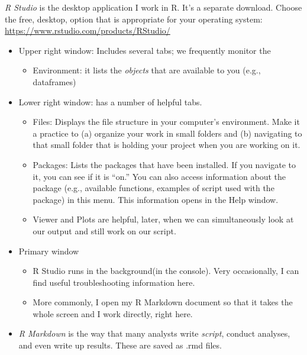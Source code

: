 \documentclass[
]{book}
\providecommand{\tightlist}{%
  \setlength{\itemsep}{0pt}\setlength{\parskip}{0pt}}
\begin{document}
\emph{R Studio} is the desktop application I work in R. It's a separate download. Choose the free, desktop, option that is appropriate for your operating system: \url{https://www.rstudio.com/products/RStudio/}

\begin{itemize}
\tightlist
\item
  Upper right window: Includes several tabs; we frequently monitor the

  \begin{itemize}
  \tightlist
  \item
    Environment: it lists the \emph{objects} that are available to you (e.g., dataframes)
  \end{itemize}
\item
  Lower right window: has a number of helpful tabs.

  \begin{itemize}
  \tightlist
  \item
    Files: Displays the file structure in your computer's environment. Make it a practice to (a) organize your work in small folders and (b) navigating to that small folder that is holding your project when you are working on it.
  \item
    Packages: Lists the packages that have been installed. If you navigate to it, you can see if it is ``on.'' You can also access information about the package (e.g., available functions, examples of script used with the package) in this menu. This information opens in the Help window.
  \item
    Viewer and Plots are helpful, later, when we can simultaneously look at our output and still work on our script.
  \end{itemize}
\item
  Primary window

  \begin{itemize}
  \tightlist
  \item
    R Studio runs in the background(in the console). Very occasionally, I can find useful troubleshooting information here.
  \item
    More commonly, I open my R Markdown document so that it takes the whole screen and I work directly, right here.
  \end{itemize}
\item
  \emph{R Markdown} is the way that many analysts write \emph{script}, conduct analyses, and even write up results. These are saved as .rmd files.


\end{itemize}
\end{document}
